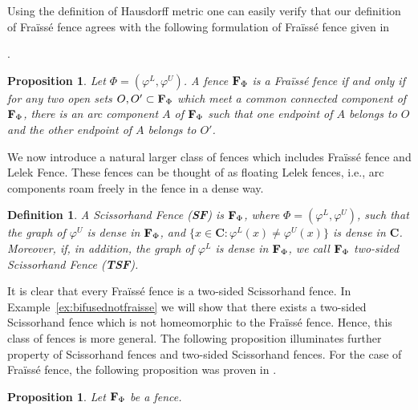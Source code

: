 \documentclass[11pt]{amsart}
\newtheorem{proposition}[theorem]{Proposition}
\newtheorem{definition}[theorem]{Definition}
\newcommand{\cantor}{\mathbf C}
\newcommand{\fence}{{\bf F}_{\Phi}{}}
\begin{document}
Using the definition of Hausdorff metric one can easily verify that our definition of Fra\"iss\'e fence agrees with the following formulation of Fra\"iss\'e fence given in {\cite[Theorem 5.3]{BassoCamerlo}.  
\begin{proposition}\label{prop:denseG_delta}
Let $\Phi=(\varphi^L,\varphi^U)$. A fence $\fence$ is a Fra\"iss\'e fence if and only if for any two open sets $O,O'\subset {\bf F}_{\Phi}$ which meet a common connected component of ${\bf F}_{\Phi}$, there is an arc component $A$ of  ${\bf F}_{\Phi}$ such that one endpoint of $A$ 
belongs to $O$ and the other endpoint of $A$ belongs to $O'$.  
\end{proposition}

We now introduce a natural larger class of fences which includes Fra\"iss\'e fence and Lelek Fence. 
These fences can be thought of as  floating Lelek fences, i.e., arc components roam freely in the fence in a dense way. 

\begin{definition}\label{def:scissorhand}
A \emph{Scissorhand Fence} ({\bf SF}) is  $\fence$, where $\Phi=(\varphi^L,\varphi^U)$, such that
the graph of $\varphi^U$ is dense in $\fence$, and 
$\{x \in \cantor: \varphi^L(x) \neq \varphi^U (x) \} $ is dense in $\cantor$. Moreover, if, in addition, the graph of $\varphi^L$ is dense in $\fence$, we call $\fence$ \emph{two-sided Scissorhand Fence} ({\bf TSF}).
\end{definition}

It is clear that every Fra\"iss\'e fence is a two-sided Scissorhand fence. In Example~\ref{ex:bifusednotfraisse} we will show that there exists a  two-sided Scissorhand fence which is not homeomorphic to the Fra\"iss\'e fence. Hence, this class of fences is more general. The following proposition illuminates further property of Scissorhand fences and two-sided Scissorhand fences. For the case of Fra\"iss\'e fence, the following proposition was proven in \cite[Proposition 5.19]{BassoCamerlo}. 

\begin{proposition}\label{prop:pointcompdense} Let $\fence$ be a fence. 
\begin{enumerate}


\end{enumerate}
\end{proposition}}
\end{document}
